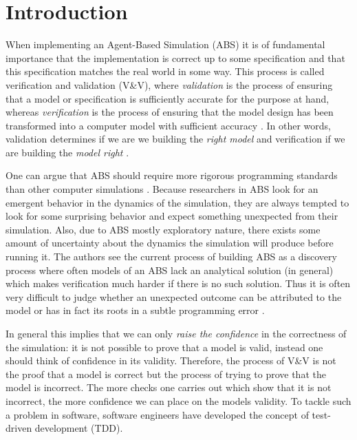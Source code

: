\section{Introduction}
When implementing an Agent-Based Simulation (ABS) it is of fundamental importance that the implementation is correct up to some specification and that this specification matches the real world in some way. This process is called verification and validation (V\&V), where \textit{validation} is the process of ensuring that a model or specification is sufficiently accurate for the purpose at hand, whereas \textit{verification} is the process of ensuring that the model design has been transformed into a computer model with sufficient accuracy \cite{robinson_simulation:_2014}. In other words, validation determines if we are we building the \textit{right model} and verification if we are building the \textit{model right} \cite{balci_verification_1998}.

One can argue that ABS should require more rigorous programming standards than other computer simulations \cite{polhill_ghost_2005}. Because researchers in ABS look for an emergent behavior in the dynamics of the simulation, they are always tempted to look for some surprising behavior and expect something unexpected from their simulation. 
Also, due to ABS mostly exploratory nature, there exists some amount of uncertainty about the dynamics the simulation will produce before running it. The authors \cite{ormerod_validation_2006} see the current process of building ABS as a discovery process where often models of an ABS lack an analytical solution (in general) which makes verification much harder if there is no such solution. Thus it is often very difficult to judge whether an unexpected outcome can be attributed to the model or has in fact its roots in a subtle programming error .

In general this implies that we can only \textit{raise the confidence} in the correctness of the simulation: it is not possible to prove that a model is valid, instead one should think of confidence in its validity. Therefore, the process of V\&V is not the proof that a model is correct but the process of trying to prove that the model is incorrect. The more checks one carries out which show that it is not incorrect, the more confidence we can place on the models validity. To tackle such a problem in software, software engineers have developed the concept of test-driven development (TDD).

